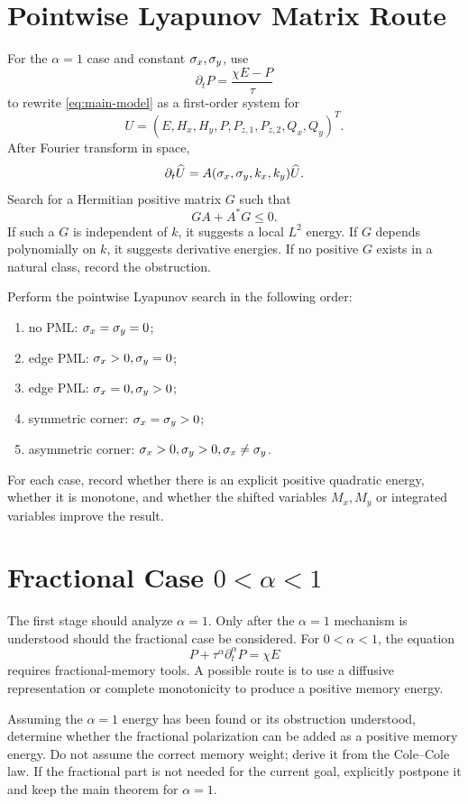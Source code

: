\documentclass[UTF8,a4paper,12pt]{ctexart}
\begin{document}
\section{Pointwise Lyapunov Matrix Route}

For the \(\alpha=1\) case and constant \(\sigma_x,\sigma_y\), use
\[
  \partial_tP=\frac{\chi E-P}{\tau}
\]
to rewrite \eqref{eq:main-model} as a first-order system for
\[
  U=(E,H_x,H_y,P,P_{z,1},P_{z,2},Q_x,Q_y)^T.
\]
After Fourier transform in space,
\[
  \partial_t\widehat U=A(\sigma_x,\sigma_y,k_x,k_y)\widehat U.
\]
Search for a Hermitian positive matrix \(G\) such that
\[
  G A + A^*G\le0.
\]
If such a \(G\) is independent of \(k\), it suggests a local \(L^2\) energy.  If \(G\) depends polynomially on \(k\), it suggests derivative energies.  If no positive \(G\) exists in a natural class, record the obstruction.

\begin{task}
Perform the pointwise Lyapunov search in the following order:
\begin{enumerate}
\item no PML: \(\sigma_x=\sigma_y=0\);
\item edge PML: \(\sigma_x>0,\sigma_y=0\);
\item edge PML: \(\sigma_x=0,\sigma_y>0\);
\item symmetric corner: \(\sigma_x=\sigma_y>0\);
\item asymmetric corner: \(\sigma_x>0,\sigma_y>0,\sigma_x\ne\sigma_y\).
\end{enumerate}
For each case, record whether there is an explicit positive quadratic energy, whether it is monotone, and whether the shifted variables \(M_x,M_y\) or integrated variables improve the result.
\end{task}

\section{Fractional Case \texorpdfstring{\(0<\alpha<1\)}{0<alpha<1}}

The first stage should analyze \(\alpha=1\).  Only after the \(\alpha=1\) mechanism is understood should the fractional case be considered.  For \(0<\alpha<1\), the equation
\[
  P+\tau^\alpha\partial_t^\alpha P=\chi E
\]
requires fractional-memory tools.  A possible route is to use a diffusive representation or complete monotonicity to produce a positive memory energy.

\begin{task}
Assuming the \(\alpha=1\) energy has been found or its obstruction understood, determine whether the fractional polarization can be added as a positive memory energy.  Do not assume the correct memory weight; derive it from the Cole--Cole law.  If the fractional part is not needed for the current goal, explicitly postpone it and keep the main theorem for \(\alpha=1\).
\end{task}
\end{document}
